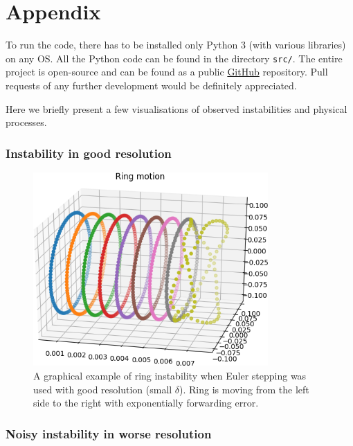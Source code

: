 \chapter{Appendix}

To run the code, there has to be installed only Python 3 (with various libraries) on any OS. All the Python code can be found in the directory \texttt{src/}. The entire project is open-source and can be found as a public \href{https://github.com/KuboBahyl/superfluid}{GitHub} repository. Pull requests of any further development would be definitely appreciated.

Here we briefly present a few visualisations of observed instabilities and physical processes.

\subsection*{Instability in good resolution}


\begin{figure}[h]
	\centering
	\includegraphics[width=0.8\textwidth]{graphics/results/euler_instability}
	\caption{A graphical example of ring instability when Euler stepping was used with good resolution (small $\delta$). Ring is moving from the left side to the right with exponentially forwarding error.}
\end{figure}

\subsection*{Noisy instability in worse resolution}

